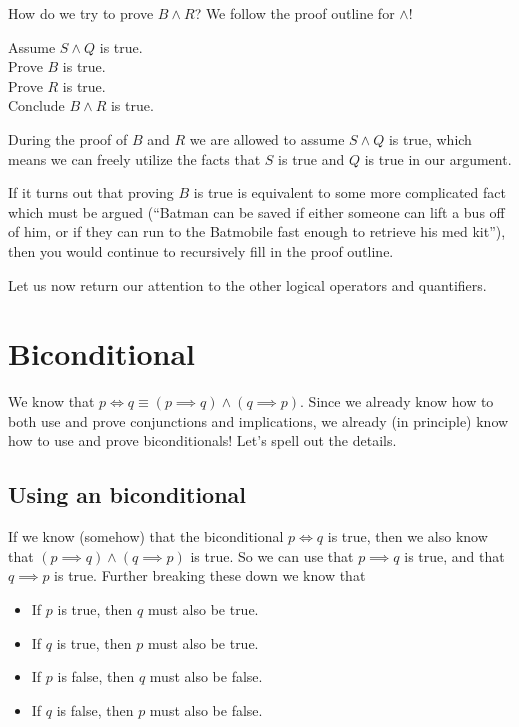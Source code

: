 \documentclass{article}
\newcommand{\equivalent}{\Longleftrightarrow}
\begin{document}
 

How do we try to prove $B \wedge R$?  We follow the proof outline for $\wedge$!

\begin{fitch*}
	\textrm{Assume $S \wedge Q$ is true.}\\
	\fa \textrm{Prove $B$ is true.}\\
	\fa \textrm{Prove $R$  is true.}\\
	\fa \textrm{Conclude $B \wedge R$ is true.}
\end{fitch*}

During the proof of $B$ and $R$ we are allowed to assume $S \wedge Q$ is true, which means we can freely utilize the facts that $S$ is true and $Q$ is true in our argument.

If it turns out that proving $B$ is true is equivalent to some more complicated fact which must be argued (``Batman can be saved if either someone can lift a bus off of him, or if they can run to the Batmobile fast enough to retrieve his med kit''), then you would continue to recursively fill in the proof outline.

Let us now return our attention to the other logical operators and quantifiers.

\newpage

\section{Biconditional}

We know that $p \equivalent q \equiv (p \implies q) \wedge (q \implies p)$.  Since we already know how to both use and prove conjunctions and implications, we already (in principle) know how to use and prove biconditionals!  Let's spell out the details.

\subsection{Using an biconditional} 

If we know (somehow) that the biconditional $p \equivalent q$ is true, then we also know that $(p \implies q) \wedge (q \implies p)$ is true.  So we can use that $p \implies q$ is true, and that $q \implies p$ is true.   Further breaking these down we know that

\begin{itemize}
		\item If $p$ is true, then $q$ must also be true.
		\item If $q$ is true, then $p$ must also be true.
		\item If $p$ is false, then $q$ must also be false.
		\item If $q$ is false, then $p$ must also be false. 
	\end{itemize}
\end{document}
